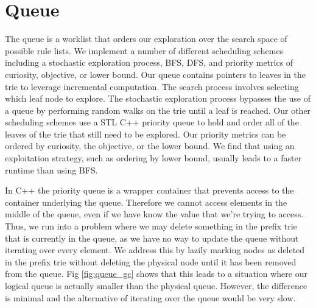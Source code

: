 \section{Queue}\label{sec:queue}
The queue is a worklist that orders our exploration over the search space of possible rule lists.
We implement a number of different scheduling schemes including a stochastic exploration process, BFS, DFS, and priority metrics of curiosity, objective, or lower bound.
Our queue contains pointers to leaves in the trie to leverage incremental computation.
The search process involves selecting which leaf node to explore.
The stochastic exploration process bypasses the use of a queue by performing random walks on the trie until a leaf is reached.
Our other scheduling schemes use a STL C++ priority queue to hold and order all of the leaves of the trie that still need to be explored.
Our priority metrics can be ordered by curiosity, the objective, or the lower bound.
We find that using an exploitation strategy, such as ordering by lower bound, usually leads to a faster runtime than using BFS.

In C++ the priority queue is a wrapper container that prevents access to the container underlying the queue.
Therefore we cannot access elements in the middle of the queue, even if we have know the value that we're trying to access.
Thus, we run into a problem where we may delete something in the prefix trie that is currently in the queue, as we have no way to update the queue without iterating over every element.
We address this by lazily marking nodes as deleted in the prefix trie without deleting the physical node until it has been removed from the queue.
Fig \ref{fig:queue_gc} shows that this leads to a situation where our logical queue is actually smaller than the physical queue.
However, the difference is minimal and the alternative of iterating over the queue would be very slow.

